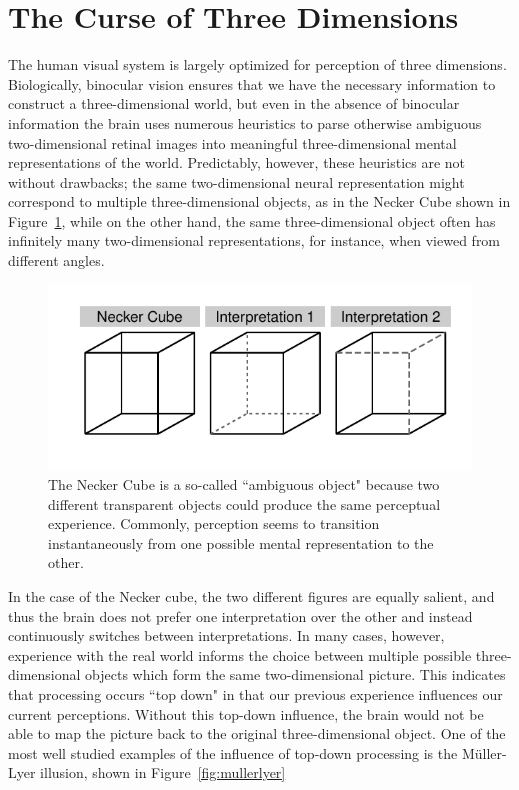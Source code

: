 \documentclass[journal]{vgtc}\usepackage{graphicx, color}
\begin{document}
\section{The Curse of Three Dimensions}
The human visual system is largely optimized for perception of three dimensions. Biologically, binocular vision ensures that we have the necessary information to construct a three-dimensional world, but even in the absence of binocular information the brain uses numerous heuristics to parse otherwise ambiguous two-dimensional retinal images into meaningful three-dimensional mental representations of the world. Predictably, however, these heuristics are not without drawbacks; the same two-dimensional neural representation might correspond to multiple three-dimensional objects, as in the Necker Cube shown in Figure~\ref{fig:Necker}, while on the other hand, the same three-dimensional object often has infinitely many two-dimensional representations, for instance, when viewed from different angles. 
\begin{figure}[H]
\includegraphics[keepaspectratio=TRUE,width=\linewidth]{figure/fig-neckercube}
\caption{The Necker Cube is a so-called ``ambiguous object" because two different transparent objects could produce the same perceptual experience. Commonly, perception seems to transition instantaneously from one possible mental representation to the other.}\label{fig:Necker}
\end{figure}
In the case of the Necker cube, the two different figures are equally salient, and thus the brain does not prefer one interpretation over the other and instead continuously switches between interpretations. In many cases, however, experience with the real world  informs the choice between multiple possible three-dimensional objects which form the same two-dimensional picture. This indicates that processing occurs ``top down" in that our previous experience influences our current perceptions. Without this top-down influence, the brain would not be able to map the picture back to the original three-dimensional object. One of the most well studied examples of the influence of top-down processing is the M\"uller-Lyer illusion, shown in Figure~\ref{fig:mullerlyer}
\end{document}
